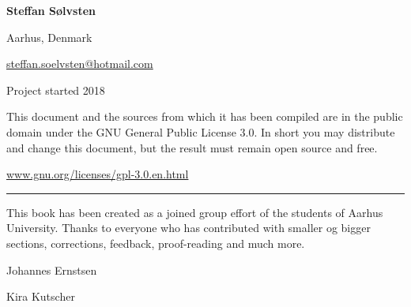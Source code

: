 \textbf{Steffan Sølvsten}

Aarhus, Denmark

\href{mailto:steffan.soelvsten@hotmail.com}{steffan.soelvsten@hotmail.com}

\vspace{1em}
\noindent Project started 2018

\vspace{1em}
\noindent This document and the sources from which it has been compiled are in
the public domain under the GNU General Public License 3.0. In short you may
distribute and change this document, but the result must remain open source and
free.

\begin{center}
  \href{https://www.gnu.org/licenses/gpl-3.0.en.html}{www.gnu.org/licenses/gpl-3.0.en.html}
\end{center}

\vspace{2em}
\noindent\hfil\rule{0.8\textwidth}{.4pt}\hfil

\vspace{2em}
\noindent This book has been created as a joined group effort of the students of Aarhus
University. Thanks to everyone who has contributed with smaller og bigger
sections, corrections, feedback, proof-reading and much more.

\begin{multicols}{2}
  Johannes Ernstsen

  \hfill
  \columnbreak
  
  Kira Kutscher
\end{multicols}